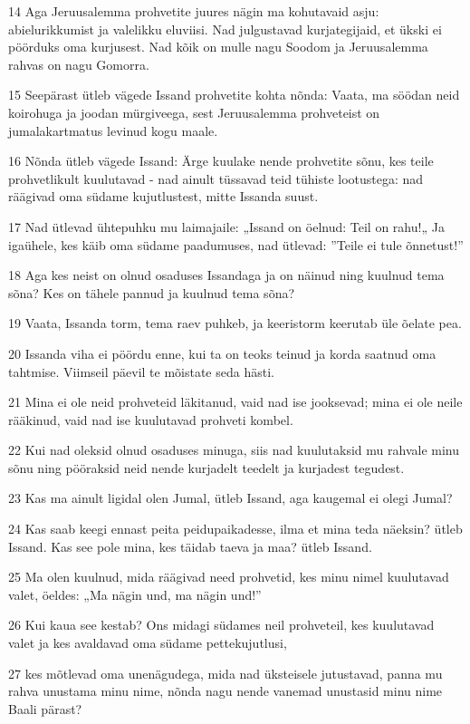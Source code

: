 \par 14 Aga Jeruusalemma prohvetite juures nägin ma kohutavaid asju: abielurikkumist ja valelikku eluviisi. Nad julgustavad kurjategijaid, et ükski ei pöörduks oma kurjusest. Nad kõik on mulle nagu Soodom ja Jeruusalemma rahvas on nagu Gomorra.
\par 15 Seepärast ütleb vägede Issand prohvetite kohta nõnda: Vaata, ma söödan neid koirohuga ja joodan mürgiveega, sest Jeruusalemma prohveteist on jumalakartmatus levinud kogu maale.
\par 16 Nõnda ütleb vägede Issand: Ärge kuulake nende prohvetite sõnu, kes teile prohvetlikult kuulutavad - nad ainult tüssavad teid tühiste lootustega: nad räägivad oma südame kujutlustest, mitte Issanda suust.
\par 17 Nad ütlevad ühtepuhku mu laimajaile: „Issand on öelnud: Teil on rahu!„ Ja igaühele, kes käib oma südame paadumuses, nad ütlevad: ”Teile ei tule õnnetust!”
\par 18 Aga kes neist on olnud osaduses Issandaga ja on näinud ning kuulnud tema sõna? Kes on tähele pannud ja kuulnud tema sõna?
\par 19 Vaata, Issanda torm, tema raev puhkeb, ja keeristorm keerutab üle õelate pea.
\par 20 Issanda viha ei pöördu enne, kui ta on teoks teinud ja korda saatnud oma tahtmise. Viimseil päevil te mõistate seda hästi.
\par 21 Mina ei ole neid prohveteid läkitanud, vaid nad ise jooksevad; mina ei ole neile rääkinud, vaid nad ise kuulutavad prohveti kombel.
\par 22 Kui nad oleksid olnud osaduses minuga, siis nad kuulutaksid mu rahvale minu sõnu ning pööraksid neid nende kurjadelt teedelt ja kurjadest tegudest.
\par 23 Kas ma ainult ligidal olen Jumal, ütleb Issand, aga kaugemal ei olegi Jumal?
\par 24 Kas saab keegi ennast peita peidupaikadesse, ilma et mina teda näeksin? ütleb Issand. Kas see pole mina, kes täidab taeva ja maa? ütleb Issand.
\par 25 Ma olen kuulnud, mida räägivad need prohvetid, kes minu nimel kuulutavad valet, öeldes: „Ma nägin und, ma nägin und!”
\par 26 Kui kaua see kestab? Ons midagi südames neil prohveteil, kes kuulutavad valet ja kes avaldavad oma südame pettekujutlusi,
\par 27 kes mõtlevad oma unenägudega, mida nad üksteisele jutustavad, panna mu rahva unustama minu nime, nõnda nagu nende vanemad unustasid minu nime Baali pärast?
